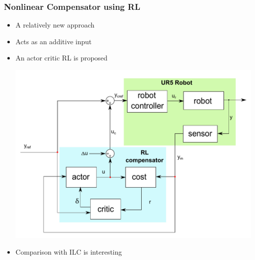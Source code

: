 \documentclass{beamer}
\begin{document}
			\begin{frame}\frametitle{Nonlinear Compensator using RL}
				\vspace{3mm}
				\fontsize{8}{4}\selectfont 
				\begin{itemize}
					\item A relatively new approach
					\item Acts as an additive input
					\item An actor critic RL is proposed
					
					\begin{center}
						\includegraphics[width=0.80\linewidth]{images/nonlin_compensator}
					\end{center}
					\item Comparison with ILC is interesting
				\end{itemize}
				
			\end{frame}		
			
\end{document}
